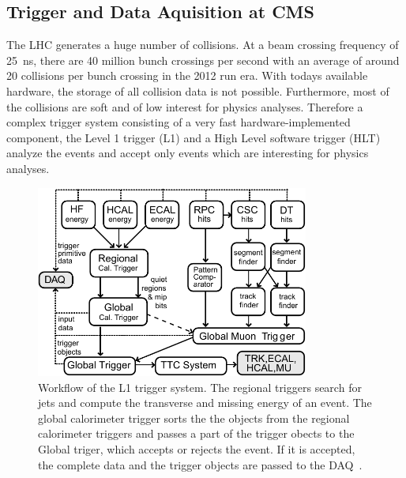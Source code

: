 \subsection{Trigger and Data Aquisition at CMS}

The LHC generates a huge number of collisions. At a beam crossing frequency of
\SI{25}{\nano \second}, there are 40 million bunch crossings per second with an
average of around 20 collisions per bunch crossing in the 2012 run era. With
todays available hardware, the storage of all collision data is not possible.
Furthermore, most of the collisions are soft and of low interest for physics
analyses. Therefore a complex trigger system consisting of a very fast
hardware-implemented component, the Level 1 trigger (L1) and a High Level
software trigger (HLT) analyze the events and accept only events which are
interesting for physics analyses.

\begin{figure}[htp]
    \centering
    \includegraphics[width=0.8\textwidth]{figures/cms_detector/cms_l1_trigger.pdf}\hfill
    \caption[The L1 Trigger of CMS]{Workflow of the L1 trigger system. The
        regional triggers search for jets and compute the transverse and missing
        energy of an event. The global calorimeter trigger sorts the the objects
        from the regional calorimeter triggers and passes a part of the trigger
        obects to the Global triger, which accepts or rejects the event. If it
        is accepted, the complete data and the trigger objects are passed to the
        DAQ~\cite{Sphicas:2002gg}.}
    \label{fig:cms:l1_trigger}
\end{figure}

